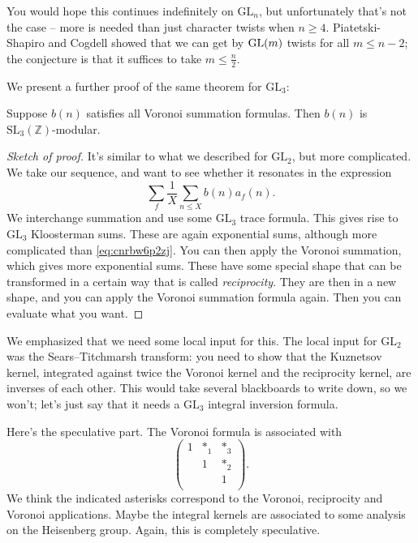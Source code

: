 \documentclass[reqno]{amsart} 
\numberwithin{theorem}{section}
\numberwithin{equation}{section}
\begin{document}
\begin{remark}
  You would hope this continues indefinitely on $\mathrm{GL}_n$, but unfortunately that's not the case -- more is needed than just character twists when $n \geq 4$.  Piatetski-Shapiro and Cogdell showed that we can get by $\operatorname{GL}(m)$ twists for all $m \leq n - 2$; the conjecture is that it suffices to take $m \leq \tfrac{n}{2}$.
\end{remark}

We present a further proof of the same theorem for $\mathrm{GL}_3$:
\begin{theorem}
  Suppose $b(n)$ satisfies all Voronoi summation formulas.  Then $b(n)$ is $\mathrm{SL}_3(\mathbb{Z})$-modular.
\end{theorem}
\begin{proof}[Sketch of proof]
  It's similar to what we described for $\mathrm{GL}_2$, but more complicated.  We take our sequence, and want to see whether it resonates in the expression
  \begin{equation*}
    \sum_f \frac{1}{X} \sum_{n \leq X} b(n) a_f(n).
  \end{equation*}
  We interchange summation and use some $\mathrm{GL}_3$ trace formula.  This gives rise to $\mathrm{GL}_3$ Kloosterman sums.  These are again exponential sums, although more complicated than \eqref{eq:cnrbw6p2zj}.  You can then apply the Voronoi summation, which gives more exponential sums.  These have some special shape that can be transformed in a certain way that is called \emph{reciprocity}.  They are then in a new shape, and you can apply the Voronoi summation formula again.  Then you can evaluate what you want.
\end{proof}

\begin{remark}
  We emphasized that we need some local input for this.  The local input for $\mathrm{GL}_2$ was the Sears--Titchmarsh transform: you need to show that the Kuznetsov kernel, integrated against twice the Voronoi kernel and the reciprocity kernel, are inverses of each other.  This would take several blackboards to write down, so we won't; let's just say that it needs a $\mathrm{GL}_3$ integral inversion formula.
\end{remark}

\begin{remark}
  Here's the speculative part.  The Voronoi formula is associated with
  \begin{equation*}
    \begin{pmatrix}
      1      & \ast_1 & \ast_3 \\
             & 1 & \ast_2 \\
             &  & 1 \\
    \end{pmatrix}.
  \end{equation*}
  We think the indicated asterisks correspond to the Voronoi, reciprocity and Voronoi applications.  Maybe the integral kernels are associated to some analysis on the Heisenberg group.  Again, this is completely speculative.
\end{remark}
\end{document}
